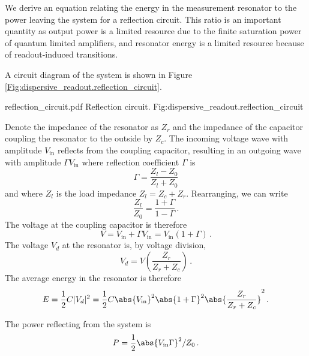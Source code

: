 
We derive an equation relating the energy in the measurement resonator to the power leaving the system for a reflection circuit.
This ratio is an important quantity as output power is a limited resource due to the finite saturation power of quantum limited amplifiers, and resonator energy is a limited resource because of readout-induced transitions.

A circuit diagram of the system is shown in Figure \ref{Fig:dispersive_readout.reflection_circuit}.

\quickfig{\columnwidth}
{reflection_circuit.pdf}
{Reflection circuit.}
{Fig:dispersive_readout.reflection_circuit}


Denote the impedance of the resonator as $Z_r$ and the impedance of the capacitor coupling the resonator to the outside by $Z_c$.
The incoming voltage wave with amplitude $V_\text{in}$ reflects from the coupling capacitor, resulting in an outgoing wave with amplitude $\Gamma V_\text{in}$ where reflection coefficient $\Gamma$ is
\begin{equation}
  \Gamma = \frac{Z_l - Z_0}{Z_l + Z_0}
\end{equation}
and where $Z_l$ is the load impedance $Z_l = Z_c + Z_r$.
Rearranging, we can write
\begin{equation}
  \frac{Z_l}{Z_0} = \frac{1 + \Gamma}{1 - \Gamma} \, .
\end{equation}
The voltage at the coupling capacitor is therefore
\begin{equation}
  V = V_\text{in} + \Gamma V_\text{in} = V_\text{in}(1 + \Gamma) \, .
\end{equation}
The voltage $V_d$ at the resonator is, by voltage division,
\begin{equation}
  V_d = V \left( \frac{Z_r}{Z_r + Z_c} \right) \, .
\end{equation}
The average energy in the resonator is therefore
\begin{equation}
  E
  = \frac{1}{2} C |V_d|^2
  = \frac{1}{2} C \abs{V_\text{in}}^2 \abs{1 + \Gamma}^2 \abs{\frac{Z_r}{Z_r + Z_c}}^2 \, .
\end{equation}


The power reflecting from the system is
\begin{equation}
  P = \frac{1}{2} \abs{V_\text{in} \Gamma}^2 / Z_0 \, .
\end{equation}

